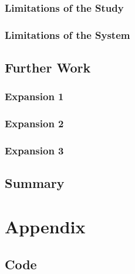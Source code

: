 \documentclass[11pt, a4paper, twocolumn, twoside]{report}
\begin{document}
\subsection{Limitations of the Study}

\subsection{Limitations of the System}

\section{Further Work}

\subsection{Expansion 1}

\subsection{Expansion 2}

\subsection{Expansion 3}

\section{Summary}
\onecolumn



\newpage

\chapter*{Appendix}

\section{Code}
\end{document}
